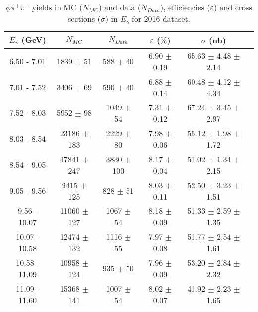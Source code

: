 \begin{center}
\begin{table}[h]
    \caption{$\phi \pi^{+}\pi^{-}$ yields in MC ($N_{MC}$) and data ($N_{Data}$), efficiencies ($\varepsilon$) and cross sections ($\sigma$) in $E_{\gamma}$ for 2016 dataset.}
    \label{tab.y2175.xsec_ul.phi2pi.1.1}
    \begin{tabular}{|c|c|c|c|c|c|}
    \hline
    $E_{\gamma}$ (GeV) & $N_{MC}$ & $N_{Data}$ & $\varepsilon$ ($\%$) & $\sigma$ (nb) \\ 
    \hline
   6.50 - 7.01 & 1839 $\pm$ 51 & 588 $\pm$ 40 & 6.90 $\pm$ 0.19 & 65.63 $\pm$ 4.48 $\pm$ 2.14 \\ 
   7.01 - 7.52 & 3406 $\pm$ 69 & 590 $\pm$ 40 & 6.88 $\pm$ 0.14 & 60.48 $\pm$ 4.12 $\pm$ 4.34 \\ 
   7.52 - 8.03 & 5952 $\pm$ 98 & 1049 $\pm$ 54 & 7.31 $\pm$ 0.12 & 67.24 $\pm$ 3.45 $\pm$ 2.97 \\ 
   8.03 - 8.54 & 23186 $\pm$ 183 & 2229 $\pm$ 80 & 7.98 $\pm$ 0.06 & 55.12 $\pm$ 1.98 $\pm$ 1.72 \\ 
   8.54 - 9.05 & 47841 $\pm$ 247 & 3830 $\pm$ 100 & 8.17 $\pm$ 0.04 & 51.02 $\pm$ 1.34 $\pm$ 2.15 \\ 
   9.05 - 9.56 & 9415 $\pm$ 125 & 828 $\pm$ 51 & 8.03 $\pm$ 0.11 & 52.50 $\pm$ 3.23 $\pm$ 1.51 \\ 
   9.56 - 10.07 & 11060 $\pm$ 127 & 1067 $\pm$ 54 & 8.18 $\pm$ 0.09 & 51.33 $\pm$ 2.59 $\pm$ 1.35 \\ 
   10.07 - 10.58 & 12474 $\pm$ 132 & 1116 $\pm$ 55 & 7.97 $\pm$ 0.08 & 51.77 $\pm$ 2.54 $\pm$ 1.61 \\ 
   10.58 - 11.09 & 10958 $\pm$ 124 & 935 $\pm$ 50 & 7.96 $\pm$ 0.09 & 53.20 $\pm$ 2.84 $\pm$ 2.32 \\ 
   11.09 - 11.60 & 15368 $\pm$ 141 & 1007 $\pm$ 54 & 8.02 $\pm$ 0.07 & 41.92 $\pm$ 2.23 $\pm$ 1.65 \\ 
   \hline
\end{tabular}
\end{table}
\null
\vfill
\end{center}


